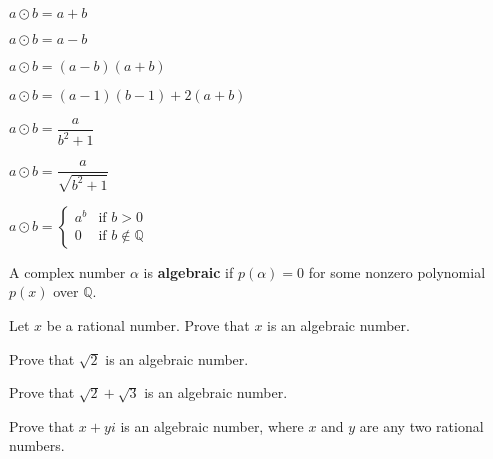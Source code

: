 \begin{multicols}{2}
\begin{chapex}
\label{cqClosureOfNumberSetsBegin}
$a \odot b = a + b$
\end{chapex}

\begin{chapex}
$a \odot b = a - b$
\end{chapex}

\begin{chapex}
$a \odot b = (a-b)(a+b)$
\end{chapex}

\begin{chapex}
$a \odot b = (a-1)(b-1) + 2(a+b)$
\end{chapex}

\begin{chapex}
$a \odot b = \dfrac{a}{b^2+1}$
\end{chapex}

\begin{chapex}
$a \odot b = \dfrac{a}{\sqrt{b^2+1}}$
\end{chapex}

\begin{chapex}
\label{cqClosureOfNumberSetsEnd}
$a \odot b = \begin{cases} a^{b} & \text{if $b > 0$} \\ 0 & \text{if $b \not\in \mathbb{Q}$} \end{cases}$
\end{chapex}
\end{multicols}

\begin{definition}
A complex number $\alpha$ is \textbf{algebraic} if $p(\alpha) = 0$ for some nonzero polynomial $p(x)$ over $\mathbb{Q}$.
\end{definition}

\begin{chapex}
Let $x$ be a rational number. Prove that $x$ is an algebraic number.
\end{chapex}

\begin{chapex}
Prove that $\sqrt{2}$ is an algebraic number.
\end{chapex}

\begin{chapex}
Prove that $\sqrt{2} + \sqrt{3}$ is an algebraic number.
\end{chapex}

\begin{chapex}
Prove that $x+yi$ is an algebraic number, where $x$ and $y$ are any two rational numbers.
\end{chapex}

